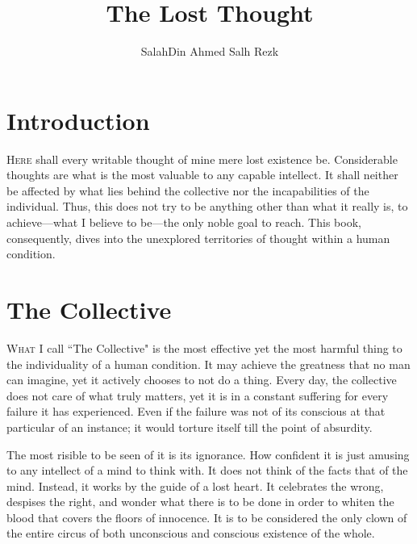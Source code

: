 \documentclass[twoside]{book}
\author{SalahDin Ahmed Salh Rezk}
\title{The Lost Thought}
\begin{document}
\NoBgThispage

\frontmatter
\maketitle
\tableofcontents

\chapter*{Introduction}



\lettrine{H}{ere} shall every writable thought of mine mere lost existence be.
Considerable thoughts are what is the most valuable to any capable intellect. It
shall neither be affected by what lies behind the collective nor the
incapabilities of the individual. Thus, this does not try to be anything other
than what it really is, to achieve—what I believe to be—the only noble goal
to reach. This book, consequently, dives into the unexplored territories of
thought within a human condition.


\mainmatter

\BgThispage

\chapter{The Collective}

\lettrine{W}{hat} I call ``The Collective" is the most effective yet the most
harmful thing to the individuality of a human condition. It may achieve the
greatness that no man can imagine, yet it actively chooses to not do a thing.
Every day, the collective does not care of what truly matters, yet it is in a
constant suffering for every failure it has experienced. Even if the failure was
not of its conscious at that particular of an instance; it would torture itself
till the point of absurdity.

The most risible to be seen of it is its ignorance. How confident it is just
amusing to any intellect of a mind to think with. It does not think of the facts
that of the mind. Instead, it works by the guide of a lost heart. It celebrates
the wrong, despises the right, and wonder what there is to be done in order to
whiten the blood that covers the floors of innocence. It is to be considered the
only clown of the entire circus of both unconscious and conscious existence of
the whole.
\end{document}
